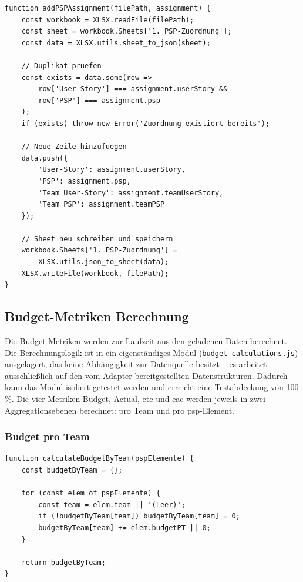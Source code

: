 \begin{lstlisting}[caption={PSP-Zuordnung hinzufügen}, label={lst:add-assignment}]
function addPSPAssignment(filePath, assignment) {
    const workbook = XLSX.readFile(filePath);
    const sheet = workbook.Sheets['1. PSP-Zuordnung'];
    const data = XLSX.utils.sheet_to_json(sheet);

    // Duplikat pruefen
    const exists = data.some(row =>
        row['User-Story'] === assignment.userStory &&
        row['PSP'] === assignment.psp
    );
    if (exists) throw new Error('Zuordnung existiert bereits');

    // Neue Zeile hinzufuegen
    data.push({
        'User-Story': assignment.userStory,
        'PSP': assignment.psp,
        'Team User-Story': assignment.teamUserStory,
        'Team PSP': assignment.teamPSP
    });

    // Sheet neu schreiben und speichern
    workbook.Sheets['1. PSP-Zuordnung'] =
        XLSX.utils.json_to_sheet(data);
    XLSX.writeFile(workbook, filePath);
}
\end{lstlisting}

\subsection{Budget-Metriken Berechnung}

Die Budget-Metriken werden zur Laufzeit aus den geladenen Daten berechnet. Die Berechnungslogik ist in ein eigenständiges Modul (\texttt{budget-calculations.js}) ausgelagert, das keine Abhängigkeit zur Datenquelle besitzt -- es arbeitet ausschließlich auf den vom Adapter bereitgestellten Datenstrukturen. Dadurch kann das Modul isoliert getestet werden und erreicht eine Testabdeckung von 100\,\%. Die vier Metriken Budget, Actual, \gls{etc} und \gls{eac} werden jeweils in zwei Aggregationsebenen berechnet: pro Team und pro \gls{psp}-Element.

\subsubsection{Budget pro Team}

\begin{lstlisting}[caption={Budget-Berechnung pro Team}, label={lst:budget-calc}]
function calculateBudgetByTeam(pspElemente) {
    const budgetByTeam = {};

    for (const elem of pspElemente) {
        const team = elem.team || '(Leer)';
        if (!budgetByTeam[team]) budgetByTeam[team] = 0;
        budgetByTeam[team] += elem.budgetPT || 0;
    }

    return budgetByTeam;
}
\end{lstlisting}


